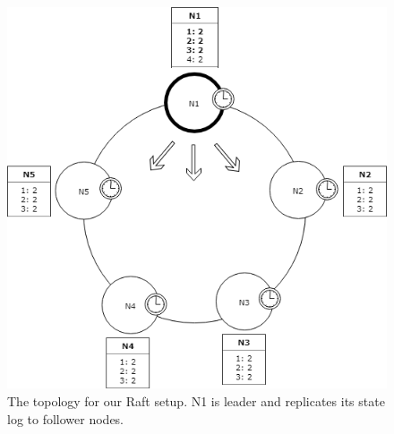 \begin{figure}[H]
	\centering
	\includegraphics[scale=0.5]{faultTolerance/fig/Raft.png}
	\caption{The topology for our Raft setup. N1 is leader and replicates its state log to follower nodes.}
	\label{fig:raft}
\end{figure}



